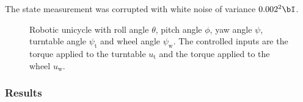 The state measurement was corrupted with white noise of variance $0.002^2\bI$.




\begin{figure}[t]
\centering

\caption{Robotic unicycle with roll angle $\theta$, pitch angle $\phi$, yaw angle $\psi$, turntable angle $\psi_{\text{t}}$ and wheel angle $\psi_{\text{w}}$. The controlled inputs are the torque applied to the turntable $u_{\text{t}}$ and the torque applied to the wheel $u_{\text{w}}$.}
\label{fig:unicycle}
\end{figure}


\subsubsection{Results}



